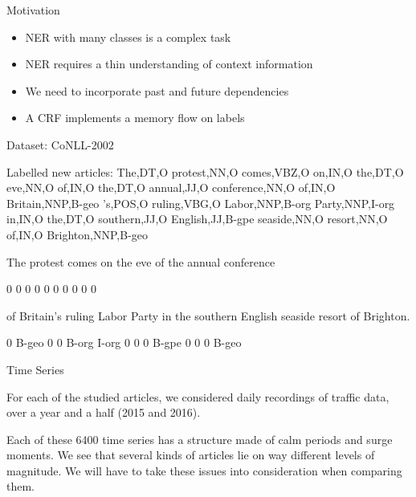 \documentclass[final]{beamer}
\newlength{\onecolwid}
\begin{document}
\begin{frame}[t]
\begin{columns}[t]
\begin{column}{\onecolwid}
\begin{block}{Motivation}
    \begin{itemize}
      \item NER with many classes is a complex task
      \item NER requires a thin understanding of context information
      \item We need to incorporate past and future dependencies
      \item A CRF implements a memory flow on labels
    \end{itemize}

\end{block}

\begin{block}{Dataset: CoNLL-2002}

Labelled new articles:
The,DT,O
protest,NN,O
comes,VBZ,O
on,IN,O
the,DT,O
eve,NN,O
of,IN,O
the,DT,O
annual,JJ,O
conference,NN,O
of,IN,O
Britain,NNP,B-geo
's,POS,O
ruling,VBG,O
Labor,NNP,B-org
Party,NNP,I-org
in,IN,O
the,DT,O
southern,JJ,O
English,JJ,B-gpe
seaside,NN,O
resort,NN,O
of,IN,O
Brighton,NNP,B-geo

The protest comes on the eve of the annual conference

0 0 0 0 0 0 0 0 0 0 

of Britain's ruling Labor Party in the southern English seaside resort of Brighton.

0 B-geo 0 0 B-org I-org 0 0 0 B-gpe 0 0 0 B-geo
\end{block}

\begin{block}{Time Series}

For each of the studied articles, we considered daily recordings of traffic data, over a year and a half (2015 and 2016).

\vspace{5mm}

Each of these 6400 time series has a structure made of calm periods and surge moments. We see that several kinds of articles lie on way different levels of magnitude. We will have to take these issues into consideration when comparing them.

\begin{center}
\end{center}

\end{block}



\end{column}
\end{columns}
\end{frame}
\end{document}
